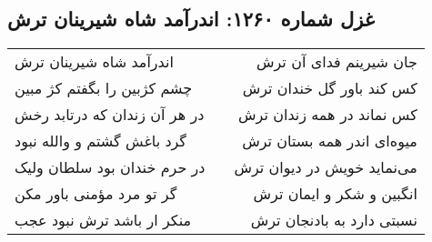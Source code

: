 \begin{center}
\section*{غزل شماره ۱۲۶۰: اندرآمد شاه شیرینان ترش}
\label{sec:1260}
\begin{longtable}{l p{0.5cm} r}
اندرآمد شاه شیرینان ترش
&&
جان شیرینم فدای آن ترش
\\
چشم کژبین را بگفتم کژ مبین
&&
کس کند باور گل خندان ترش
\\
در هر آن زندان که درتابد رخش
&&
کس نماند در همه زندان ترش
\\
گرد باغش گشتم و والله نبود
&&
میوه‌ای اندر همه بستان ترش
\\
در حرم خندان بود سلطان ولیک
&&
می‌نماید خویش در دیوان ترش
\\
گر تو مرد مؤمنی باور مکن
&&
انگبین و شکر و ایمان ترش
\\
منکر ار باشد ترش نبود عجب
&&
نسبتی دارد به بادنجان ترش
\\
\end{longtable}
\end{center}
